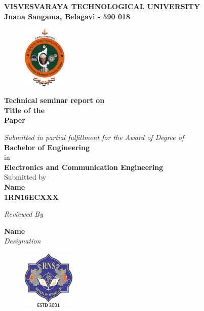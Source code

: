 
\begin{titlingpage}
	\thispagestyle{empty}\centering
	
	\setlength{\toptafiddle}{1in}
	\setlength{\bottafiddle}{1in}
	\vspace*{-0.95in}
	\enlargethispage{\toptafiddle}
	\large 
	\textbf{VISVESVARAYA TECHNOLOGICAL UNIVERSITY\\
		Jnana Sangama, Belagavi - 590 018}\\
	\vspace{0.2cm}
	\begin{figure}[h]
		\centering
		\includegraphics[height=3cm]{images/vtu.png}
	\end{figure}
	\small{\textbf{Technical seminar report on}}\\
	
	\LARGE{\textbf{\color{red}Title of the
			\\ Paper}}
	\vspace{0.5cm}
	
	\large \textit{Submitted in partial fulfillment for the Award of Degree of}\\{\textbf{Bachelor of Engineering}}\\
	in \\\textbf{Electronics and Communication Engineering}
	\vspace{0.5cm}\\
	{Submitted by\\}
		\vspace{0.1cm}
		\Large\textbf{Name}\\
		\vspace{0.1cm}
		\textbf{1RN16ECXXX}	
		
	\vspace{1cm}
	\textit{Reviewed By}
	\vspace{0.1cm}
	
	\Large{\textbf{Name}}\\
	\textit{Designation}\\
	
	\begin{figure}[h]
		\centering
		\includegraphics[height=2.8cm]{images/rns1.jpg}
	\end{figure}
	

\end{titlingpage}
